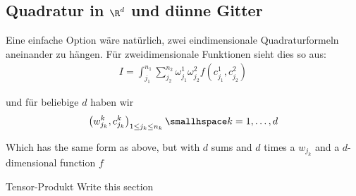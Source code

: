 \newsection
\subsection{Quadratur in $\R^d$ und dünne Gitter}
Eine einfache Option wäre natürlich, zwei eindimensionale Quadraturformeln aneinander zu hängen.
Für zweidimensionale Funktionen sieht dies so aus:
\rmvspace
\begin{align*}
    I = \int_{j_1}^{n_1} \sum_{j_2}^{n_2} \omega_{j_1}^1 \omega_{j_2}^2 f(c_{j_1}^1, c_{j_2}^2)
\end{align*}

\drmvspace
und für beliebige $d$ haben wir
\rmvspace
\begin{align*}
    \left( w_{j_k}^k, c_{j_k}^k \right)_{1 \leq j_k \leq n_k} \smallhspace k = 1, \ldots, d
\end{align*}

\drmvspace
Which has the same form as above, but with $d$ sums and $d$ times a $w_{j_k}$ and a $d$-dimensional function $f$

\begin{recall}[]{Tensor-Produkt}
    \TODO Write this section
\end{recall}
